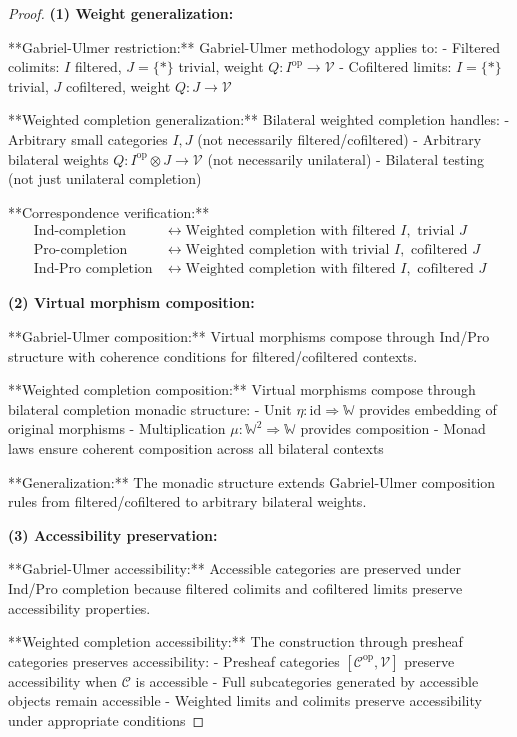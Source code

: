 \documentclass[11pt]{article}
\theoremstyle{plain}
\theoremstyle{definition}
\theoremstyle{remark}
\newcommand{\V}{\mathcal{V}}
\newcommand{\C}{\mathcal{C}}
\newcommand{\op}{\mathrm{op}}
\begin{document}
\begin{proof}
\textbf{(1) Weight generalization:}

**Gabriel-Ulmer restriction:** Gabriel-Ulmer methodology applies to:
- Filtered colimits: $I$ filtered, $J = \{\ast\}$ trivial, weight $Q : I^{\op} \to \V$ 
- Cofiltered limits: $I = \{\ast\}$ trivial, $J$ cofiltered, weight $Q : J \to \V$

**Weighted completion generalization:** Bilateral weighted completion handles:
- Arbitrary small categories $I, J$ (not necessarily filtered/cofiltered)
- Arbitrary bilateral weights $Q : I^{\op} \otimes J \to \V$ (not necessarily unilateral)
- Bilateral testing (not just unilateral completion)

**Correspondence verification:**
\begin{align}
\text{Ind-completion} &\leftrightarrow \text{Weighted completion with filtered } I, \text{ trivial } J \\
\text{Pro-completion} &\leftrightarrow \text{Weighted completion with trivial } I, \text{ cofiltered } J \\
\text{Ind-Pro completion} &\leftrightarrow \text{Weighted completion with filtered } I, \text{ cofiltered } J
\end{align}

\textbf{(2) Virtual morphism composition:}

**Gabriel-Ulmer composition:** Virtual morphisms compose through Ind/Pro structure with coherence conditions for filtered/cofiltered contexts.

**Weighted completion composition:** Virtual morphisms compose through bilateral completion monadic structure:
- Unit $\eta : \text{id} \Rightarrow \mathbb{W}$ provides embedding of original morphisms
- Multiplication $\mu : \mathbb{W}^2 \Rightarrow \mathbb{W}$ provides composition
- Monad laws ensure coherent composition across all bilateral contexts

**Generalization:** The monadic structure extends Gabriel-Ulmer composition rules from filtered/cofiltered to arbitrary bilateral weights.

\textbf{(3) Accessibility preservation:}

**Gabriel-Ulmer accessibility:** Accessible categories are preserved under Ind/Pro completion because filtered colimits and cofiltered limits preserve accessibility properties.

**Weighted completion accessibility:** The construction through presheaf categories preserves accessibility:
- Presheaf categories $[\C^{\op}, \V]$ preserve accessibility when $\C$ is accessible
- Full subcategories generated by accessible objects remain accessible
- Weighted limits and colimits preserve accessibility under appropriate conditions


\end{proof}
\end{document}

